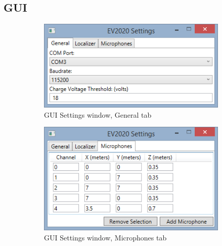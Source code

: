 \documentclass[final]{scrreprt} %
\begin{document}
\begin{appendices}
\chapter{GUI}
\label{app:gui}
\begin{figure}[h]
\centering
\begin{subfigure}[t]{0.49\linewidth}
	\includegraphics[width=\linewidth]{resources/UI-Settings-General.png}
	\caption{GUI Settings window, General tab}
	\label{fig:UI-Settings-General}
\end{subfigure}
\begin{subfigure}[t]{0.49\linewidth}
	\includegraphics[width=\linewidth]{resources/UI-Settings-Microphones.png}
	\caption{GUI Settings window, Microphones tab}
	\label{fig:UI-Settings-Microphones}
\end{subfigure}
\begin{subfigure}[t]{0.48\linewidth}

\end{subfigure}
\end{figure}
\end{appendices}
\end{document}
